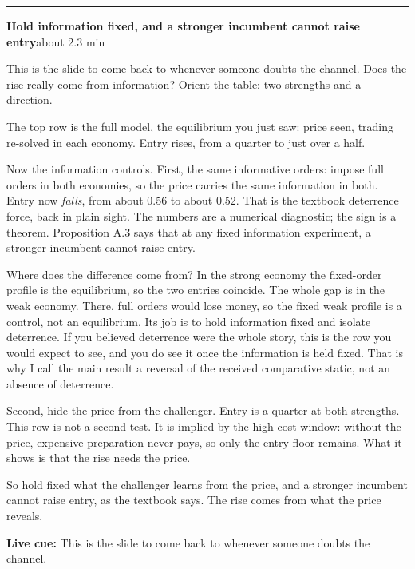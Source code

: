 \documentclass[11pt]{article}
\newcommand{\Cue}[1]{\par\nobreak\smallskip\noindent
  \textcolor{ScriptGray}{\footnotesize\textbf{Live cue:} #1}\par}
\newcommand{\scriptframe}[3]{%
  \Needspace{9\baselineskip}%
  \par\medskip\noindent\textcolor{ScriptBlue}{\rule{\linewidth}{0.55pt}}%
  \par\smallskip\noindent
  \textbf{#1}\hfill\textcolor{ScriptGray}{\small #2}\par\smallskip
  #3\par}
\begin{document}
\scriptframe{Hold information fixed, and a stronger incumbent cannot raise entry}{about 2.3 min}{%
  This is the slide to come back to whenever someone doubts the channel. Does
  the rise really come from information? Orient the table: two strengths and a
  direction.

  The top row is the full model, the equilibrium you just saw: price seen,
  trading re-solved in each economy. Entry rises, from a quarter to just over a half.

  Now the information controls. First, the same informative orders: impose
  full orders in both economies, so the price carries the same information in
  both.
  Entry now \emph{falls}, from about 0.56 to about 0.52.
  That is the textbook deterrence force, back in plain sight. The numbers are a
  numerical diagnostic; the sign is a theorem. Proposition A.3 says that at any
  fixed information experiment, a stronger incumbent cannot raise entry.

  Where does the difference come from? In the strong economy the fixed-order
  profile is the equilibrium, so the two entries coincide. The whole gap is in the weak
  economy. There, full orders would lose money, so the fixed weak profile is a
  control, not an equilibrium. Its job is to hold information fixed and isolate
  deterrence. If you believed deterrence were the whole story, this is the row
  you would expect to see, and you do see it once the information is held
  fixed. That is why I call the main result a reversal of the received
  comparative static, not an absence of deterrence.

  Second, hide the price from the challenger. Entry is a quarter at both
  strengths.
  This row is not a second test. It is implied by the high-cost window: without
  the price, expensive preparation never pays, so only the entry floor remains.
  What it shows is that the rise needs the price.

  So hold fixed what the challenger learns from the price, and a stronger
  incumbent cannot raise entry, as the textbook says. The rise comes from what the price reveals.
  \Cue{This is the slide to come back to whenever someone doubts the channel.}
}
\end{document}
